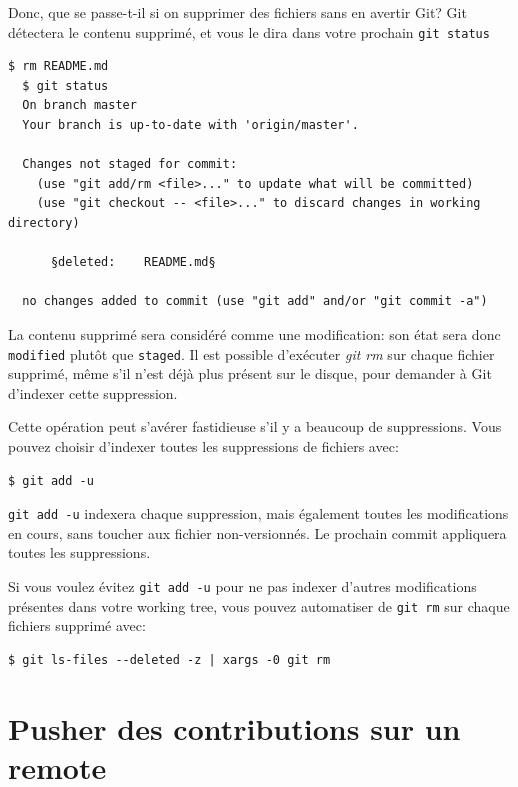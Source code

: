 \documentclass{../../common/tufte-latex/tufte-handout}
\begin{document}
Donc, que se passe-t-il si on supprimer des fichiers sans en avertir Git?
Git détectera le contenu supprimé, et vous le dira dans votre prochain \texttt{git status}

\begin{lstlisting}[style=BashInputStyle]
  $ rm README.md
  $ git status
  On branch master
  Your branch is up-to-date with 'origin/master'.

  Changes not staged for commit:
    (use "git add/rm <file>..." to update what will be committed)
    (use "git checkout -- <file>..." to discard changes in working directory)

      §deleted:    README.md§

  no changes added to commit (use "git add" and/or "git commit -a")
\end{lstlisting}

La contenu supprimé sera considéré comme une modification: son état sera donc \texttt{modified} plutôt que \texttt{staged}.
Il est possible d'exécuter \textit{git rm} sur chaque fichier supprimé, même s'il n'est déjà plus présent sur le disque, pour demander à Git d'indexer cette suppression.

Cette opération peut s'avérer fastidieuse s'il y a beaucoup de suppressions.
Vous pouvez choisir d'indexer toutes les suppressions de fichiers avec:

\begin{lstlisting}[style=BashInputStyle]
  $ git add -u
\end{lstlisting}

\texttt{git add -u} indexera chaque suppression, mais également toutes les modifications en cours, sans toucher aux fichier non-versionnés.
Le prochain commit appliquera toutes les suppressions.

Si vous voulez évitez \texttt{git add -u} pour ne pas indexer d'autres modifications présentes dans votre working tree, vous pouvez automatiser de \texttt{git rm} sur chaque fichiers supprimé avec:

\begin{lstlisting}[style=BashInputStyle]
  $ git ls-files --deleted -z | xargs -0 git rm
\end{lstlisting}

\section{Pusher des contributions sur un remote}
\end{document}
